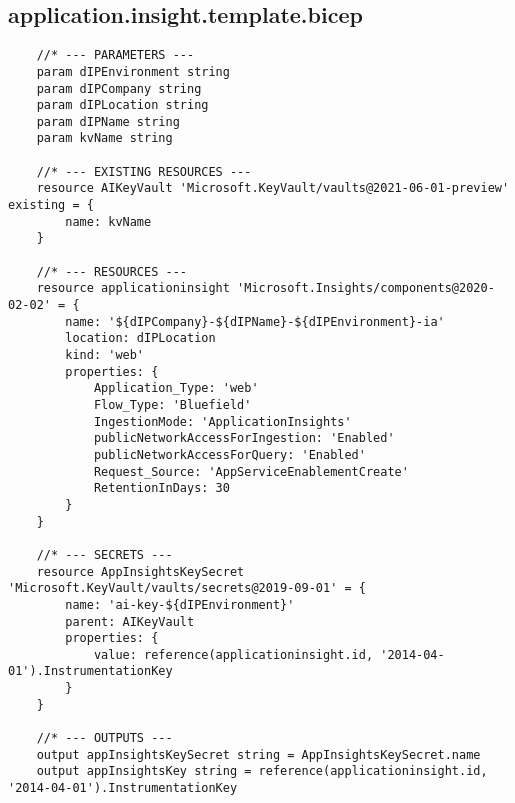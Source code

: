\documentclass[dutch,dit,thesis]{hogentreport}
\begin{document}
\subsection{application.insight.template.bicep}
\label{sec:application.insight.template.bicep}
\begin{lstlisting}
    //* --- PARAMETERS ---
    param dIPEnvironment string
    param dIPCompany string
    param dIPLocation string
    param dIPName string
    param kvName string

    //* --- EXISTING RESOURCES ---
    resource AIKeyVault 'Microsoft.KeyVault/vaults@2021-06-01-preview' existing = {
        name: kvName
    }

    //* --- RESOURCES ---
    resource applicationinsight 'Microsoft.Insights/components@2020-02-02' = {
        name: '${dIPCompany}-${dIPName}-${dIPEnvironment}-ia'
        location: dIPLocation
        kind: 'web'
        properties: {
            Application_Type: 'web'
            Flow_Type: 'Bluefield'
            IngestionMode: 'ApplicationInsights'
            publicNetworkAccessForIngestion: 'Enabled'
            publicNetworkAccessForQuery: 'Enabled'
            Request_Source: 'AppServiceEnablementCreate'
            RetentionInDays: 30
        }
    }

    //* --- SECRETS ---
    resource AppInsightsKeySecret 'Microsoft.KeyVault/vaults/secrets@2019-09-01' = {
        name: 'ai-key-${dIPEnvironment}'
        parent: AIKeyVault
        properties: {
            value: reference(applicationinsight.id, '2014-04-01').InstrumentationKey
        }
    }

    //* --- OUTPUTS ---
    output appInsightsKeySecret string = AppInsightsKeySecret.name
    output appInsightsKey string = reference(applicationinsight.id, '2014-04-01').InstrumentationKey

\end{lstlisting}
\end{document}

